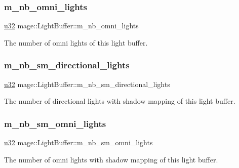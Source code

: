 \subsubsection{\texorpdfstring{m\+\_\+nb\+\_\+omni\+\_\+lights}{m\_nb\_omni\_lights}}
{\footnotesize\ttfamily \hyperlink{namespacemage_af2b398bf98eb10351f49cad73fe2cc73}{u32} mage\+::\+Light\+Buffer\+::m\+\_\+nb\+\_\+omni\+\_\+lights}

The number of omni lights of this light buffer. \hypertarget{structmage_1_1_light_buffer_a5c4f2c1f5f67be5bd31237ea7327d2dd}{}\label{structmage_1_1_light_buffer_a5c4f2c1f5f67be5bd31237ea7327d2dd} 
\subsubsection{\texorpdfstring{m\+\_\+nb\+\_\+sm\+\_\+directional\+\_\+lights}{m\_nb\_sm\_directional\_lights}}
{\footnotesize\ttfamily \hyperlink{namespacemage_af2b398bf98eb10351f49cad73fe2cc73}{u32} mage\+::\+Light\+Buffer\+::m\+\_\+nb\+\_\+sm\+\_\+directional\+\_\+lights}

The number of directional lights with shadow mapping of this light buffer. \hypertarget{structmage_1_1_light_buffer_a4330db1d8eb37fc18ee55acd33b67d31}{}\label{structmage_1_1_light_buffer_a4330db1d8eb37fc18ee55acd33b67d31} 
\subsubsection{\texorpdfstring{m\+\_\+nb\+\_\+sm\+\_\+omni\+\_\+lights}{m\_nb\_sm\_omni\_lights}}
{\footnotesize\ttfamily \hyperlink{namespacemage_af2b398bf98eb10351f49cad73fe2cc73}{u32} mage\+::\+Light\+Buffer\+::m\+\_\+nb\+\_\+sm\+\_\+omni\+\_\+lights}

The number of omni lights with shadow mapping of this light buffer. \hypertarget{structmage_1_1_light_buffer_a22e862f69f1d56aad87614bc0ad2690b}{}\label{structmage_1_1_light_buffer_a22e862f69f1d56aad87614bc0ad2690b} 
